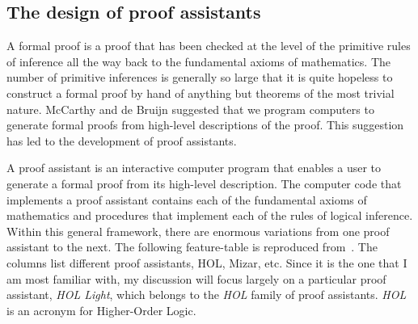 \documentclass{llncs}
\begin{document}
\subsection{The design of proof assistants}

A formal proof is a proof that has been checked at the level of the
primitive rules of inference all the way back to the fundamental
axioms of mathematics.  The number of primitive inferences is
generally so large that it is quite hopeless to construct a formal
proof by hand of anything but theorems of the most trivial nature.
McCarthy and de Bruijn suggested that we program computers to generate
formal proofs from high-level descriptions of the proof.  This
suggestion has led to the development of proof assistants.


A proof assistant is an interactive computer program that enables a user to
generate a formal proof from its high-level description.  The computer code
that implements a proof assistant contains each of the fundamental axioms
of mathematics and procedures that implement each of the rules of logical
inference.  Within this general framework, there are enormous variations
from one proof assistant to the next. The following feature-table is
reproduced from~\cite{wiedijk:17}.  The columns list different proof
assistants, HOL, Mizar, etc.  Since it is the one that I am most familiar with,
my discussion will focus largely on a particular
proof assistant, {\it HOL Light}, which belongs to the {\it HOL} family of
proof assistants. {\it HOL} is an acronym for Higher-Order Logic.
\end{document}
